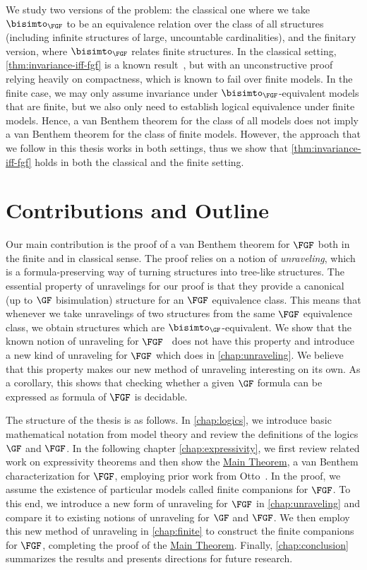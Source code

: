 We study two versions of the problem: the classical one where we take $\bisimto_{\FGF}$ to be an equivalence relation over the class of all structures (including infinite structures of large, uncountable cardinalities), and the finitary version, where $\bisimto_{\FGF}$ relates finite structures.
In the classical setting, \cref{thm:invariance-iff-fgf} is a known result~\cite{BednarczykJ22}, but with an unconstructive proof relying heavily on compactness, which is known to fail over finite models.
In the finite case, we may only assume invariance under $\bisimto_{\FGF}$-equivalent models that are finite, but we also only need to establish logical equivalence under finite models.
Hence, a van Benthem theorem for the class of all models does not imply a van Benthem theorem for the class of finite models.
However, the approach that we follow in this thesis works in both settings, thus we show that \cref{thm:invariance-iff-fgf} holds in both the classical and the finite setting.

\section{Contributions and Outline}

Our main contribution is the proof of a van Benthem theorem for $\FGF$ both in the finite and in classical sense.
The proof relies on a notion of \emph{unraveling}, which is a formula-preserving way of turning structures into tree-like structures.
The essential property of unravelings for our proof is that they provide a canonical (up to $\GF$ bisimulation) structure for an $\FGF$ equivalence class.
This means that whenever we take unravelings of two structures from the same $\FGF$ equivalence class, we obtain structures which are $\bisimto_{\GF}$-equivalent.
We show that the known notion of unraveling for $\FGF$~\cite{Bednarczyk21} does not have this property and introduce a new kind of unraveling for $\FGF$ which does in \cref{chap:unraveling}.
We believe that this property makes our new method of unraveling interesting on its own.
As a corollary, this shows that checking whether a given $\GF$ formula can be expressed as formula of $\FGF$ is decidable.

The structure of the thesis is as follows.
In \cref{chap:logics}, we introduce basic mathematical notation from model theory and review the definitions of the logics $\GF$ and $\FGF$.
In the following chapter \cref{chap:expressivity}, we first review related work on expressivity theorems and then show the \hyperref[thm:main]{Main Theorem}, a van Benthem characterization for $\FGF$, employing prior work from Otto~\cite{Otto04,Otto2012}.
In the proof, we assume the existence of particular models called finite companions for $\FGF$.
To this end, we introduce a new form of unraveling for $\FGF$  in \cref{chap:unraveling} and compare it to existing notions of unraveling for $\GF$ and $\FGF$.
We then employ this new method of unraveling in \cref{chap:finite} to construct the finite companions for $\FGF$, completing the proof of the \hyperref[thm:main]{Main Theorem}.
Finally, \cref{chap:conclusion} summarizes the results and presents directions for future research.
